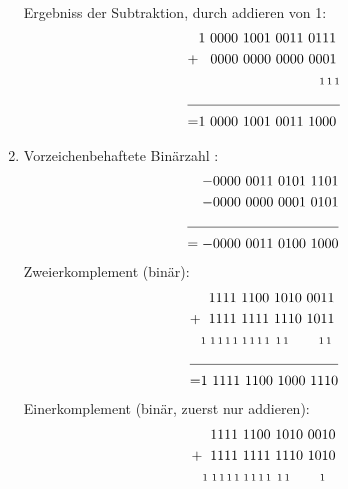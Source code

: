 \documentclass[DIN, pagenumber=false, fontsize=11pt, parskip=half]{scrartcl}
\begin{document}
\begin{enumerate}[label = (\alph*)]
\begin{align*}
            \end{align*}
            Ergebniss der Subtraktion, durch addieren von 1:
            \begin{align*}
                & 1\ 0000\ 1001\ 0011\ 0111\\
                + & \hspace{0.3cm}0000\ 0000\ 0000\ 0001\\
                & \hspace{3.03cm} {\scriptstyle1\, 1\, 1} \\
                \cline{1-2}  
                = & 1\ 0000\ 1001\ 0011\ 1000
            \end{align*}
        \item Vorzeichenbehaftete Binärzahl :
            \begin{align*}
                - & \hspace{0.0cm}0000\ 0011\ 0101\ 1101\\
                - & \hspace{0.0cm}0000\ 0000\ 0001\ 0101\\
                \cline{1-2}  
                = -& 0000\ 0011\ 0100\ 1000
            \end{align*}
            Zweierkomplement (binär):
            \begin{align*}
                & \hspace{0.2cm} 1111\ 1100\ 1010\ 0011\\
                + & \hspace{0.2cm}1111\ 1111\ 1110\ 1011\\
                & \hspace{0.0cm} {\scriptstyle 1\, \, 1\, 1\, 1\, 1\, \, 1\, 1\, 1\, 1\, \, \, 1\, 1\hspace{0.75cm}1\, 1} \\
                \cline{1-2}  
                = & 1\ 1111\ 1100\ 1000\ 1110
            \end{align*}
            Einerkomplement (binär, zuerst nur addieren):
            \begin{align*}
                & \hspace{0.2cm} 1111\ 1100\ 1010\ 0010\\
                + & \hspace{0.2cm}1111\ 1111\ 1110\ 1010\\
                & \hspace{0.0cm} {\scriptstyle 1\, \, 1\, 1\, 1\, 1\, \, 1\, 1\, 1\, 1\, \, \, 1\, 1\hspace{0.75cm}1} \\

\end{align*}
\end{enumerate}
\end{document}
